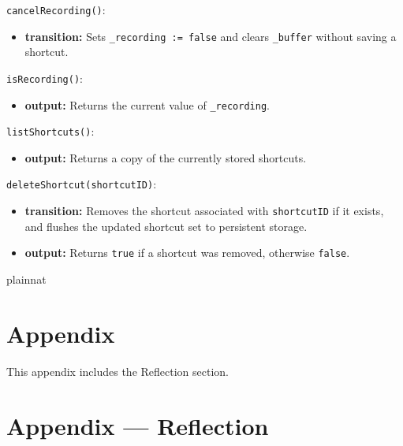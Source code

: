 \documentclass[12pt, titlepage]{article}
\begin{document}
\noindent\texttt{cancelRecording()}:
\begin{itemize}
\item \textbf{transition:} Sets \texttt{\_recording := false} and clears \texttt{\_buffer} without saving a shortcut.
\end{itemize}

\noindent\texttt{isRecording()}:
\begin{itemize}
\item \textbf{output:} Returns the current value of \texttt{\_recording}.
\end{itemize}

\noindent\texttt{listShortcuts()}:
\begin{itemize}
\item \textbf{output:} Returns a copy of the currently stored shortcuts.
\end{itemize}

\noindent\texttt{deleteShortcut(shortcutID)}:
\begin{itemize}
\item \textbf{transition:} Removes the shortcut associated with \texttt{shortcutID} if it exists, and flushes the updated shortcut set to persistent storage.
\item \textbf{output:} Returns \texttt{true} if a shortcut was removed, otherwise \texttt{false}.
\end{itemize}








 {plainnat}


\newpage

\section{Appendix} \label{Appendix}

This appendix includes the Reflection section.


\newpage{}

\section*{Appendix --- Reflection}
\end{document}
